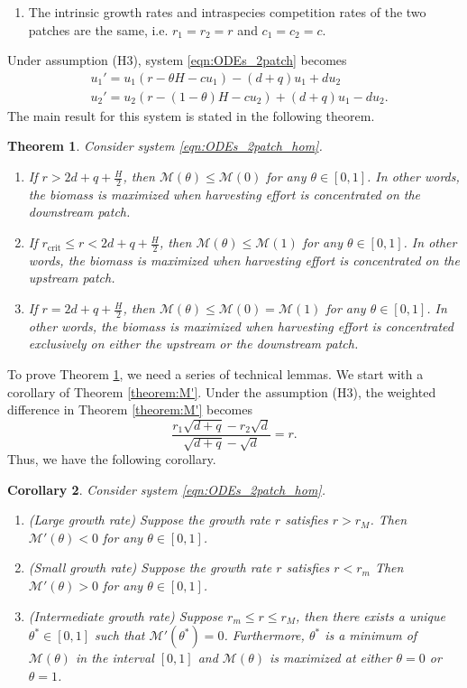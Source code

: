 \documentclass[11pt]{article}
\newtheorem{theorem}{Theorem}[section]
\newtheorem{corollary}[theorem]{Corollary}
\def\MM{\mathcal{M}}
\theoremstyle{definition}
\begin{document}
\begin{enumerate}
\item [(H3)] The intrinsic growth rates and intraspecies competition rates of the two patches are the same, i.e. $r_1=r_2=r$ and $c_1=c_2=c$.
\end{enumerate}
Under assumption (H3), system \eqref{eqn:ODEs_2patch} becomes
\begin{align}\label{eqn:ODEs_2patch_hom}
    &u_1'=u_1(r-\theta H -cu_1) -(d+q)u_1+du_2\nonumber\\
    &u_2'=u_2(r-(1-\theta)H -cu_2)+(d+q)u_1-du_2.
\end{align}
The main result for this system is stated in the following theorem.
\begin{theorem}\label{thm:max_M}
    Consider system \eqref{eqn:ODEs_2patch_hom}.
    \begin{enumerate}
        \item[(a)] If $r>2d+q+\frac{H}{2}$,  then $\MM(\theta)\leq \MM(0)$ for any $\theta\in[0,1]$. In other words, the biomass is maximized when harvesting effort is concentrated on the downstream patch.
        \item[(b)] If $r_{\text{crit}}\leq r<2d+q+\frac{H}{2}$, then $\mathcal{M}(\theta)\leq \mathcal{M}(1)$ for any $\theta\in[0,1]$.  In other words, the biomass is maximized when harvesting effort is concentrated on the upstream patch.
        \item[(c)] If $r=2d+q+\frac{H}{2}$, then $\MM(\theta)\leq \MM(0)=\MM(1)$ for any $\theta\in[0,1]$.  In other words, the biomass is maximized when harvesting effort is concentrated exclusively on either the upstream or the downstream patch.
    \end{enumerate}
\end{theorem}


To prove Theorem \ref{thm:max_M}, we need a series of technical lemmas. We start with a corollary of Theorem \ref{theorem:M'}. Under the assumption (H3), the weighted difference in Theorem \ref{theorem:M'} becomes
\[
\frac{r_1\sqrt{d+q}-r_2\sqrt{d}}{\sqrt{d+q}-\sqrt{d}} = r.
\]
Thus, we have the following corollary.





\begin{corollary}\label{cor:M'}
      Consider system \eqref{eqn:ODEs_2patch_hom}.
    \begin{enumerate}
        \item[(a)] (Large growth rate) Suppose the growth rate $r$ satisfies $r>r_M$.
        Then $\MM'(\theta)< 0$ for any $\theta\in[0,1]$. 
        \item[(b)] (Small growth rate) Suppose the growth rate $r$ satisfies $r<r_m$
        Then $\MM'(\theta)> 0$ for any $\theta\in[0,1]$.
        \item[(c)] (Intermediate growth rate) Suppose $r_m\leq r\leq r_M$, then there exists a unique $\theta^*\in[0,1]$ such that $\MM'(\theta^*)=0$. Furthermore, $\theta^*$ is a minimum of $\MM(\theta)$ in the interval $[0,1]$ and $\MM(\theta)$ is maximized at either $\theta=0$ or $\theta=1$.
        \end{enumerate} 
\end{corollary}
 
\end{document}
